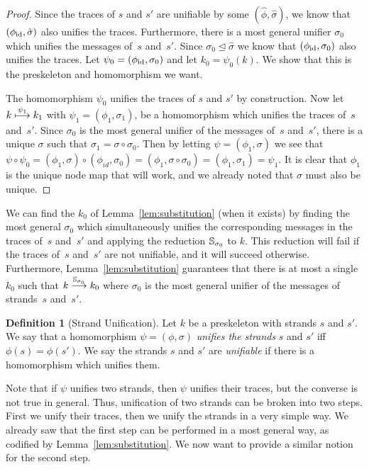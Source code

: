 \documentclass[12pt]{article}
\theoremstyle{definition}
\newtheorem{defn}{Definition}[section]
\begin{document}
\begin{proof}
Since the traces of $s$ and $s'$ are unifiable by some $(\hat{\phi},\hat{\sigma})$,
we know that $(\phi_{\mathrm{id}},\hat{\sigma})$ also unifies the traces.  Furthermore,
there is a most general unifier $\sigma_0$ which unifies the messages
of~$s$ and~$s'$.  Since
$\sigma_0\unlhd\hat{\sigma}$ we know that $(\phi_{\mathrm{id}},\sigma_0)$ also unifies
the traces.  Let $\psi_0=(\phi_{\mathrm{id}},\sigma_0)$ and let $k_0=\psi_0(k).$
We show that this is the preskeleton and homomorphism we want.

The homomorphism $\psi_0$ unifies the traces of $s$ and $s'$ by construction.
Now let $k\stackrel{\psi_1}{\longmapsto}k_1$ with $\psi_1=(\phi_1,\sigma_1)$,
be a homomorphism which unifies the traces of~$s$ and~$s'$.   Since
$\sigma_0$ is the most general unifier of the messages of~$s$ and~$s'$,
there is a unique
$\sigma$ such that $\sigma_1=\sigma\circ\sigma_0$.  Then by letting
$\psi=(\phi_1,\sigma)$ we see that $\psi\circ\psi_0 = (\phi_1,\sigma)
\circ (\phi_{id},\sigma_0) = (\phi_1,\sigma\circ\sigma_0) =
(\phi_1,\sigma_1) = \psi_1$.  It is clear that $\phi_1$ is the unique
node map that will work, and we already noted that $\sigma$ must also
be unique.
\end{proof}

We can find the $k_0$ of Lemma~\ref{lem:substitution} (when it exists)
by finding the most general $\sigma_0$ which
simultaneously unifies the corresponding messages in the traces of~$s$
and~$s'$ and applying the reduction $\mathbb S_{\sigma_0}$ to $k$.  This
reduction will fail if the traces of~$s$ and~$s'$ are not unifiable, and
it will succeed otherwise.  Furthermore, Lemma~\ref{lem:substitution}
guarantees that there is at most a single $k_0$ such that
$k\stackrel{\mathbb S_{\sigma_0}}{\longrightarrow}k_0$ where $\sigma_0$ is the most general
unifier of the messages of strands~$s$ and~$s'$.

\begin{defn}[Strand Unification]\label{def:strand-unification}
Let $k$ be a preskeleton with strands $s$ and $s'$.
 We say that a homomorphism $\psi=(\phi,\sigma)$ \emph{unifies
the strands} $s$ and $s'$ iff $\phi(s)=\phi(s')$.
We say the strands $s$ and $s'$ are \emph{unifiable}
if there is a homomorphism which unifies them.
\end{defn}

Note that if $\psi$ unifies two strands, then $\psi$ unifies their traces,
but the converse is not true in general.  Thus, unification of two strands
can be broken into two steps.  First we unify their traces, then we unify
the strands in a very simple way.  We already saw that the first step can
be performed in a most general way, as codified by Lemma~\ref{lem:substitution}.
We now want to provide a similar notion for the second step.
\end{document}
